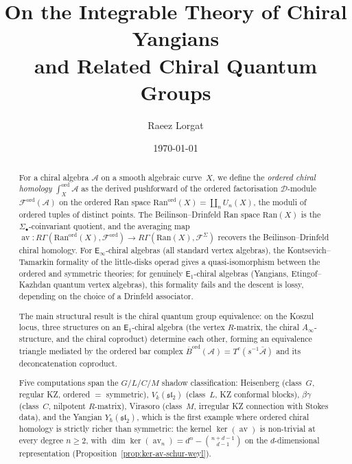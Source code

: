\documentclass[11pt,reqno]{amsart}
\theoremstyle{definition}
\theoremstyle{remark}
\newcommand{\cA}{\mathcal{A}}
\newcommand{\cD}{\mathcal{D}}
\newcommand{\cF}{\mathcal{F}}
\newcommand{\Ran}{\mathrm{Ran}}
\newcommand{\Ainf}{A_{\infty}}
\newcommand{\Eone}{\mathsf{E}_{1}}
\newcommand{\Einf}{\mathsf{E}_{\infty}}
\DeclareMathOperator{\av}{av}
\newcommand{\Barord}{\overline{B}^{\mathrm{ord}}}
\numberwithin{equation}{section}
\begin{document}
\title[Chiral Yangians]
{On the Integrable Theory of Chiral Yangians\\
and Related Chiral Quantum Groups}

\author{Raeez Lorgat}
\address{Perimeter Institute for Theoretical Physics,
  Waterloo, ON N2L 2Y5, Canada \\
  Department of Physics, University of Waterloo,
  Waterloo, ON N2L 3G1, Canada}

\date{\today}

\begin{abstract}
For a chiral algebra $\cA$ on a smooth algebraic
curve~$X$, we define the \emph{ordered chiral homology}
$\int_X^{\mathrm{ord}} \cA$ as the derived pushforward of
the ordered factorisation $\cD$-module
$\cF^{\mathrm{ord}}(\cA)$ on the ordered Ran space
$\Ran^{\mathrm{ord}}(X) = \coprod_n U_n(X)$, the moduli
of ordered tuples of distinct points. The
Beilinson--Drinfeld Ran space $\Ran(X)$ is the
$\Sigma_\bullet$-coinvariant quotient, and the averaging
map
$\av \colon R\Gamma(\Ran^{\mathrm{ord}}(X),
\cF^{\mathrm{ord}}) \to R\Gamma(\Ran(X), \cF^{\Sigma})$
recovers the Beilinson--Drinfeld chiral homology.
For $\Einf$-chiral algebras (all standard vertex algebras),
the Kontsevich--Tamarkin formality of the little-disks operad
gives a quasi-isomorphism between the ordered and symmetric
theories; for genuinely $\Eone$-chiral algebras (Yangians,
Etingof--Kazhdan quantum vertex algebras), this formality
fails and the descent is lossy, depending on the choice of a
Drinfeld associator.

The main structural result is the chiral quantum group
equivalence: on the Koszul locus, three structures on an
$\Eone$-chiral algebra (the vertex $R$-matrix, the chiral
$\Ainf$-structure, and the chiral coproduct) determine each
other, forming an equivalence triangle mediated by the
ordered bar complex
$\Barord(\cA) = T^c(s^{-1}\bar{\cA})$ and its
deconcatenation coproduct.

Five computations span the $G/L/C/M$ shadow classification:
Heisenberg (class~$G$, regular KZ, ordered $=$ symmetric),
$V_k(\mathfrak{sl}_2)$ (class~$L$, KZ conformal blocks),
$\beta\gamma$ (class~$C$, nilpotent $R$-matrix),
Virasoro (class~$M$, irregular KZ connection with Stokes
data), and the Yangian $Y_\hbar(\mathfrak{sl}_2)$, which
is the first example where ordered chiral homology is
strictly richer than symmetric: the kernel $\ker(\av)$ is
non-trivial at every degree $n \geq 2$, with
$\dim\ker(\av_n) = d^n - \binom{n+d-1}{d-1}$ on the
$d$-dimensional representation
(Proposition~\ref{prop:ker-av-schur-weyl}).


\end{abstract}
\end{document}
